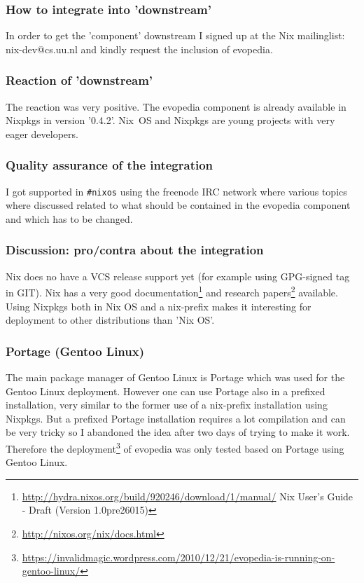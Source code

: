 \documentclass[a4paper,10pt]{article}
\begin{document}
\subsubsection*{How to integrate into 'downstream'}
In order to get the 'component' downstream I signed up at the Nix mailinglist: nix-dev@cs.uu.nl and kindly request the inclusion of evopedia.

\subsubsection*{Reaction of 'downstream'}
The reaction was very positive. The evopedia component is already available in Nixpkgs in version '0.4.2'. \mbox{Nix OS} and Nixpkgs are young projects with very eager developers.

\subsubsection*{Quality assurance of the integration}
I got supported in \texttt{\#nixos} using the freenode IRC network where various topics where discussed related to what should be contained in the evopedia component and which has to be changed.

\subsubsection*{Discussion: pro/contra about the integration}
Nix does no have a VCS release support yet (for example using GPG-signed tag in GIT). Nix has a very good documentation\footnote{\url{http://hydra.nixos.org/build/920246/download/1/manual/} Nix User's Guide - Draft (Version 1.0pre26015)} and research papers\footnote{\url{http://nixos.org/nix/docs.html}} available. Using Nixpkgs both in Nix OS and a nix-prefix makes it interesting for deployment to other distributions than 'Nix OS'. 
 






\newpage
\subsubsection{Portage (Gentoo Linux)}
The main package manager of Gentoo Linux is Portage which was used for the Gentoo Linux deployment. However one can use Portage also in a prefixed installation, very similar to the former use of a nix-prefix installation using Nixpkgs. But a prefixed Portage installation requires a lot compilation and can be very tricky so I abandoned the idea after two days of trying to make it work. Therefore the deployment\footnote{\url{https://invalidmagic.wordpress.com/2010/12/21/evopedia-is-running-on-gentoo-linux/}} of evopedia was only tested based on Portage using Gentoo Linux.
\end{document}
